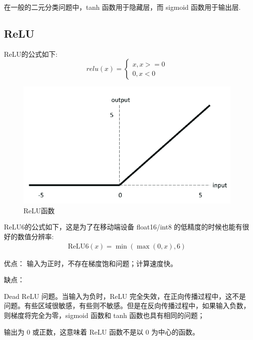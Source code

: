 \documentclass{article}
\begin{document}
在一般的二元分类问题中，tanh 函数用于隐藏层，而 sigmoid 函数用于输出层.

\subsection{ReLU}
ReLU的公式如下:
\begin{equation}
relu(x) = \begin{cases}
	x,  x>=0 \\
	0, x < 0
\end{cases}
\end{equation}
\begin{figure}[htp]
\centering
\includegraphics[scale=0.4]{images/activation/relu.png}
\caption{ReLU函数}
\label{Fig.relu}
\end{figure}

ReLU6的公式如下，这是为了在移动端设备 float16/int8 的低精度的时候也能有很好的数值分辨率:
\begin{align*}
\text{ReLU6}(x) = \min(\max(0,x), 6)
\end{align*}

优点：
输入为正时，不存在梯度饱和问题；计算速度快。

缺点：

Dead ReLU 问题。当输入为负时，ReLU 完全失效，在正向传播过程中，这不是问题。有些区域很敏感，有些则不敏感。但是在反向传播过程中，如果输入负数，则梯度将完全为零，sigmoid 函数和 tanh 函数也具有相同的问题；

输出为 0 或正数，这意味着 ReLU 函数不是以 0 为中心的函数。
\end{document}
